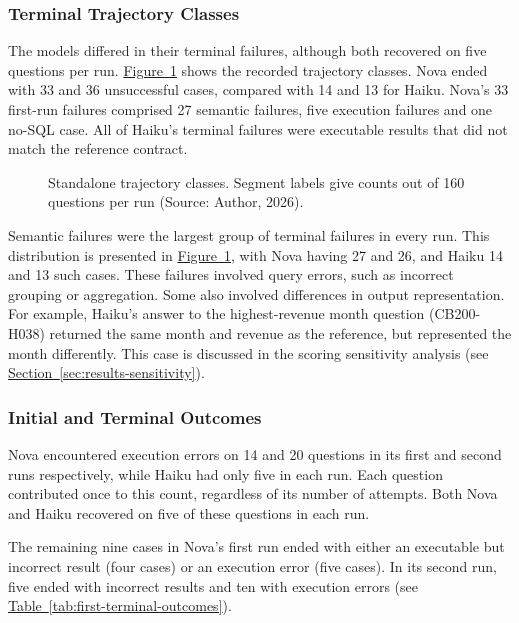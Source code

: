 \subsubsection{Terminal Trajectory Classes}

The models differed in their terminal failures, although both recovered on five questions per run.
\hyperref[fig:results-trajectories]{Figure~\ref*{fig:results-trajectories}} shows the recorded
trajectory classes. 
Nova ended with 33 and 36 unsuccessful cases, compared with 14 and 13 for Haiku. 
Nova's 33 first-run failures comprised 27 semantic failures,
five execution failures and one no-SQL case.
All of Haiku's terminal failures were executable
results that did not match the reference contract.

\begin{figure}[H]
\centering

\caption{Standalone trajectory classes. Segment labels give counts out of 160 questions per run (Source: Author, 2026).}
\label{fig:results-trajectories}
\end{figure}

Semantic failures were the largest group of terminal failures in every run.
This distribution is presented in \hyperref[fig:results-trajectories]{Figure~\ref*{fig:results-trajectories}},
with Nova having 27 and 26, and Haiku 14 and 13 such cases.
These failures involved query errors, such as incorrect grouping
or aggregation.
Some also involved differences in output representation.
For example, Haiku's answer to the highest-revenue month question (CB200-H038) returned the same month and revenue
as the reference, but represented the month differently. 
This case is discussed in the scoring sensitivity analysis
(see \hyperref[sec:results-sensitivity]{Section~\ref*{sec:results-sensitivity}}).

\subsubsection{Initial and Terminal Outcomes}
\label{sec:results-initial-terminal}
Nova encountered execution errors on 14 and 20 questions in its first and second runs respectively, 
while Haiku had only five in each run.
Each question contributed once to this count, regardless of its number of attempts.
Both Nova and Haiku recovered on five of these questions in each run.

The remaining nine cases in Nova's first run ended with either an executable but incorrect result
(four cases) or an execution error (five cases). 
In its second run, five ended with incorrect results and ten with execution errors 
(see \hyperref[tab:first-terminal-outcomes]{Table~\ref*{tab:first-terminal-outcomes}}). 

